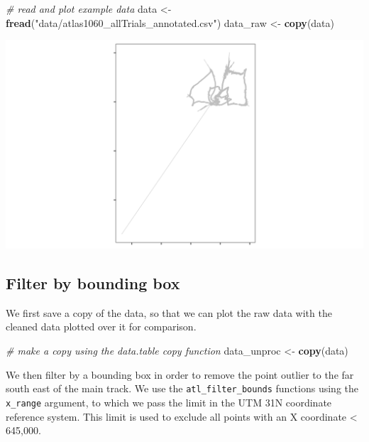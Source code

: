 \documentclass[
]{scrartcl}
\newenvironment{Shaded}{}{}
\newcommand{\CommentTok}[1]{\textcolor[rgb]{0.38,0.63,0.69}{\textit{#1}}}
\newcommand{\KeywordTok}[1]{\textcolor[rgb]{0.00,0.44,0.13}{\textbf{#1}}}
\newcommand{\NormalTok}[1]{#1}
\newcommand{\StringTok}[1]{\textcolor[rgb]{0.25,0.44,0.63}{#1}}
\begin{document}
\begin{Shaded}
\begin{Highlighting}[]
\CommentTok{\# read and plot example data}
\NormalTok{data <{-}}\StringTok{ }\KeywordTok{fread}\NormalTok{(}\StringTok{"data/atlas1060\_allTrials\_annotated.csv"}\NormalTok{)}
\NormalTok{data\_raw <{-}}\StringTok{ }\KeywordTok{copy}\NormalTok{(data)}
\end{Highlighting}
\end{Shaded}

\includegraphics{figures/fig_calibration_raw.png}

\hypertarget{filter-by-bounding-box}{%
\subsection{Filter by bounding box}\label{filter-by-bounding-box}}

We first save a copy of the data, so that we can plot the raw data with the cleaned data plotted over it for comparison.

\begin{Shaded}
\begin{Highlighting}[]
\CommentTok{\# make a copy using the data.table copy function}
\NormalTok{data\_unproc <{-}}\StringTok{ }\KeywordTok{copy}\NormalTok{(data)}
\end{Highlighting}
\end{Shaded}

We then filter by a bounding box in order to remove the point outlier to the far south east of the main track. We use the \texttt{atl\_filter\_bounds} functions using the \texttt{x\_range} argument, to which we pass the limit in the UTM 31N coordinate reference system.
This limit is used to exclude all points with an X coordinate \textless{} 645,000.
\end{document}

